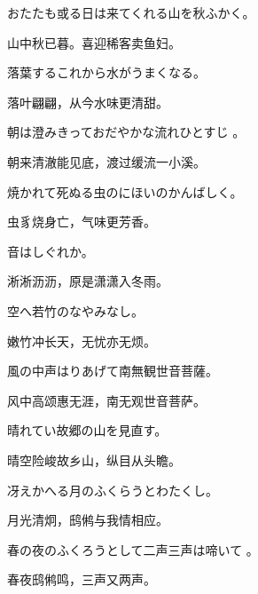 \begin{haiku}
    {\FH おたたも或る日は来てくれる山を秋ふかく。}

    {\FK 山中秋已暮。喜迎稀客卖鱼妇。}
\end{haiku}

\begin{haiku}
    {\FH 落葉するこれから水がうまくなる。}

    {\FK 落叶翩翩，从今水味更清甜。}
\end{haiku}

\begin{haiku}
    {\FH 朝は澄みきっておだやかな流れひとすじ 。}

    {\FK 朝来清澈能见底，渡过缓流一小溪。}
\end{haiku}

\begin{haiku}
    {\FH 焼かれて死ぬる虫のにほいのかんばしく。}

    {\FK 虫豸烧身亡，气味更芳香。}
\end{haiku}

\begin{haiku}
    {\FH 音はしぐれか。}

    {\FK 淅淅沥沥，原是潇潇入冬雨。}
\end{haiku}

\begin{haiku}
    {\FH 空へ若竹のなやみなし。}

    {\FK 嫩竹冲长天，无忧亦无烦。}
\end{haiku}

\begin{haiku}
    {\FH 風の中声はりあげて南無観世音菩薩。}

    {\FK 风中高颂惠无涯，南无观世音菩萨。}
\end{haiku}

\begin{haiku}
    {\FH 晴れてい故郷の山を見直す。}

    {\FK 晴空险峻故乡山，纵目从头瞻。}
\end{haiku}

\begin{haiku}
    {\FH 冴えかへる月のふくらうとわたくし。}

    {\FK 月光清炯，鸱鸺与我情相应。}
\end{haiku}

\begin{haiku}
    {\FH 春の夜のふくろうとして二声三声は啼いて 。}

    {\FK 春夜鸱鸺鸣，三声又两声。}
\end{haiku}

